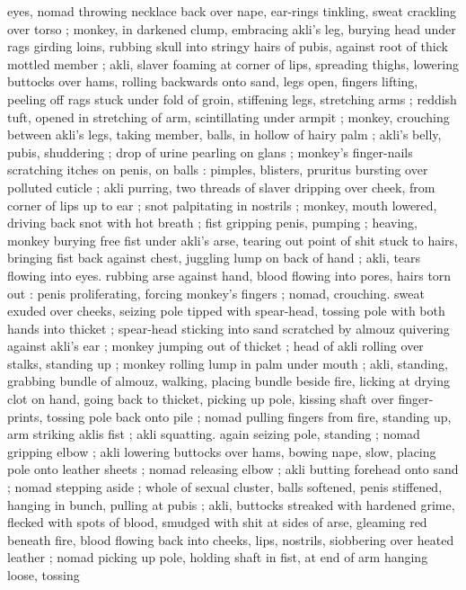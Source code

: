 eyes, nomad throwing necklace back over nape, ear-rings tinkling,
sweat crackling over torso ; monkey, in darkened clump, embracing
akli's leg, burying head under rags girding loins, rubbing skull into
stringy hairs of pubis, against root of thick mottled member ; akli,
slaver foaming at corner of lips, spreading thighs, lowering buttocks
over hams, rolling backwards onto sand, legs open, fingers lifting,
peeling off rags stuck under fold of groin, stiffening legs, stretching
arms ; reddish tuft, opened in stretching of arm, scintillating under
armpit ; monkey, crouching between akli’s legs, taking member, balls,
in hollow of hairy palm ; akli’s belly, pubis, shuddering ; drop of
urine pearling on glans ; monkey's finger-nails scratching itches on
penis, on balls : pimples, blisters, pruritus bursting over polluted
cuticle ; akli purring, two threads of slaver dripping over cheek, from
corner of lips up to ear ; snot palpitating in nostrils ; monkey, mouth
lowered, driving back snot with hot breath ; fist gripping penis,
pumping ; heaving, monkey burying free fist under akli’s arse,
tearing out point of shit stuck to hairs, bringing fist back against
chest, juggling lump on back of hand ; akli, tears flowing into eyes.
rubbing arse against hand, blood flowing into pores, hairs torn out :
penis proliferating, forcing monkey's fingers ; nomad, crouching.
sweat exuded over cheeks, seizing pole tipped with spear-head,
tossing pole with both hands into thicket ; spear-head sticking into
sand scratched by almouz quivering against akli's ear ; monkey
jumping out of thicket ; head of akli rolling over stalks, standing up
; monkey rolling lump in palm under mouth ; akli, standing, grabbing
bundle of almouz, walking, placing bundle beside fire, licking at
drying clot on hand, going back to thicket, picking up pole, kissing
shaft over finger-prints, tossing pole back onto pile ; nomad pulling
fingers from fire, standing up, arm striking aklis fist ; akli squatting.
again seizing pole, standing ; nomad gripping elbow ; akli lowering
buttocks over hams, bowing nape, slow, placing pole onto leather
sheets ; nomad releasing elbow ; akli butting forehead onto sand ;
nomad stepping aside ; whole of sexual cluster, balls softened, penis
stiffened, hanging in bunch, pulling at pubis ; akli, buttocks streaked
with hardened grime, flecked with spots of blood, smudged with shit
at sides of arse, gleaming red beneath fire, blood flowing back into
cheeks, lips, nostrils, siobbering over heated leather ; nomad picking
up pole, holding shaft in fist, at end of arm hanging loose, tossing
